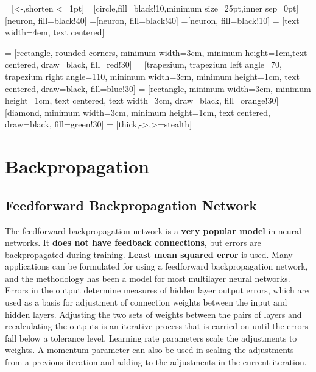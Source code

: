 \documentclass[12pt, right open]{memoir}
\begin{document}



=[<-,shorten <=1pt]
=[circle,fill=black!10,minimum size=25pt,inner sep=0pt]
=[neuron, fill=black!40]
=[neuron, fill=black!40]
=[neuron, fill=black!10]
 = [text width=4em, text centered]

 = [rectangle, rounded corners, minimum width=3cm, minimum height=1cm,text centered, draw=black, fill=red!30]
 = [trapezium, trapezium left angle=70, trapezium right angle=110, minimum width=3cm, minimum height=1cm, text centered, draw=black, fill=blue!30]
 = [rectangle, minimum width=3cm, minimum height=1cm, text centered, text width=3cm, draw=black, fill=orange!30]
 = [diamond, minimum width=3cm, minimum height=1cm, text centered, draw=black, fill=green!30]
 = [thick,->,>=stealth]

\chapter{Backpropagation}

\section{Feedforward Backpropagation Network}
The feedforward backpropagation network is a \textbf{very popular model} in neural
networks. It \textbf{does not have feedback connections}, but errors are
backpropagated during training. \textbf{Least mean squared error} is used. Many
applications can be formulated for using a feedforward backpropagation
network, and the methodology has been a model for most multilayer neural
networks. Errors in the output determine measures of hidden layer output
errors, which are used as a basis for adjustment of connection weights between
the input and hidden layers. Adjusting the two sets of weights between the
pairs of layers and recalculating the outputs is an iterative process that is
carried on until the errors fall below a tolerance level. Learning rate
parameters scale the adjustments to weights. A momentum parameter can also
be used in scaling the adjustments from a previous iteration and adding to the
adjustments in the current iteration.
\end{document}
